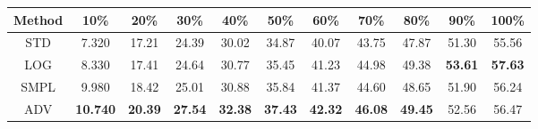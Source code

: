 \documentclass{standalone}
\begin{document}
\begin{tabular}{c|cccccccccc}
      \toprule
      Method & 10\% & 20\% & 30\% & 40\% & 50\% & 60\% & 70\% & 80\% & 90\% & 100\% \\
      \midrule
STD & 7.320 & 17.21 & 24.39 & 30.02 & 34.87 & 40.07 & 43.75 & 47.87 & 51.30 & 55.56\\
LOG & 8.330 & 17.41 & 24.64 & 30.77 & 35.45 & 41.23 & 44.98 & 49.38 & \textbf{53.61} & \textbf{57.63}\\
SMPL & 9.980 & 18.42 & 25.01 & 30.88 & 35.84 & 41.37 & 44.60 & 48.65 & 51.90 & 56.24\\
ADV & \textbf{10.740} & \textbf{20.39} & \textbf{27.54} & \textbf{32.38} & \textbf{37.43} & \textbf{42.32} & \textbf{46.08} & \textbf{49.45} & 52.56 & 56.47\\
  \bottomrule
\end{tabular}
\end{document}
